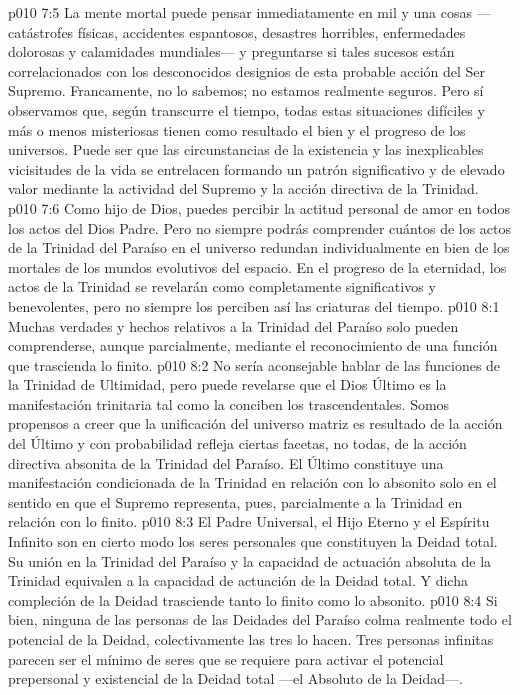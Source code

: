 \vs p010 7:5 La mente mortal puede pensar inmediatamente en mil y una cosas ---catástrofes físicas, accidentes espantosos, desastres horribles, enfermedades dolorosas y calamidades mundiales--- y preguntarse si tales sucesos están correlacionados con los desconocidos designios de esta probable acción del Ser Supremo. Francamente, no lo sabemos; no estamos realmente seguros. Pero sí observamos que, según transcurre el tiempo, todas estas situaciones difíciles y más o menos misteriosas tienen  como resultado el bien y el progreso de los universos. Puede ser que las circunstancias de la existencia y las inexplicables vicisitudes de la vida se entrelacen formando un patrón significativo y de elevado valor mediante la actividad del Supremo y la acción directiva de la Trinidad.
\vs p010 7:6 Como hijo de Dios, puedes percibir la actitud personal de amor en todos los actos del Dios Padre. Pero no siempre podrás comprender cuántos de los actos de la Trinidad del Paraíso en el universo redundan individualmente en bien de los mortales de los mundos evolutivos del espacio. En el progreso de la eternidad, los actos de la Trinidad se revelarán como completamente significativos y benevolentes, pero no siempre los perciben así las criaturas del tiempo.
\vs p010 8:1 Muchas verdades y hechos relativos a la Trinidad del Paraíso solo pueden comprenderse, aunque parcialmente, mediante el reconocimiento de una función que trascienda lo finito.
\vs p010 8:2 No sería aconsejable hablar de las funciones de la Trinidad de Ultimidad, pero puede revelarse que el Dios Último es la manifestación trinitaria tal como la conciben los trascendentales. Somos propensos a creer que la unificación del universo matriz es resultado de la acción del Último y con probabilidad refleja ciertas facetas, no todas, de la acción directiva absonita de la Trinidad del Paraíso. El Último constituye una manifestación condicionada de la Trinidad en relación con lo absonito solo en el sentido en que el Supremo representa, pues, parcialmente a la Trinidad en relación con lo finito.
\vs p010 8:3 \pc El Padre Universal, el Hijo Eterno y el Espíritu Infinito son en cierto modo los seres personales que constituyen la Deidad total. Su unión en la Trinidad del Paraíso y la capacidad de actuación absoluta de la Trinidad equivalen a la capacidad de actuación de la Deidad total. Y dicha compleción de la Deidad trasciende tanto lo finito como lo absonito.
\vs p010 8:4 Si bien, ninguna de las personas de las Deidades del Paraíso colma realmente todo el potencial de la Deidad, colectivamente las tres lo hacen. Tres personas infinitas parecen ser el mínimo de seres que se requiere para activar el potencial prepersonal y existencial de la Deidad total ---el Absoluto de la Deidad---.
